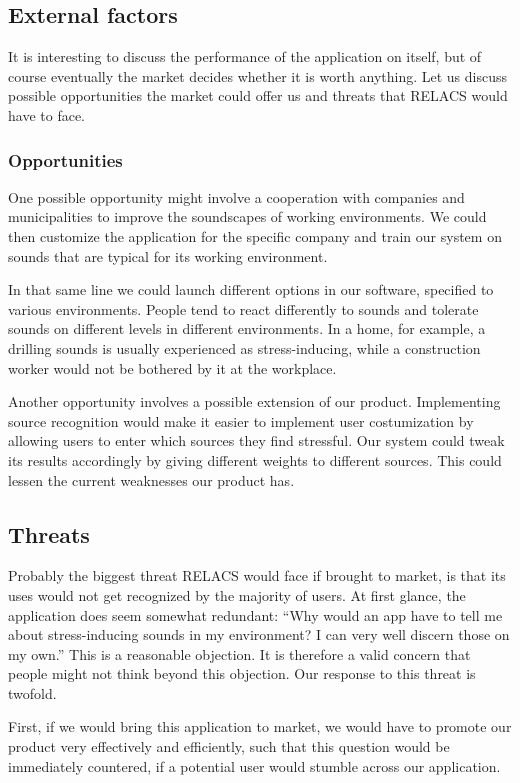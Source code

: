\documentclass[a4paper]{article}
\begin{document}
\subsection{External factors}
It is interesting to discuss the performance of the application on itself, but of course eventually the market decides whether it is worth anything.
Let us discuss possible opportunities the market could offer us and threats that RELACS would have to face.

\subsubsection{Opportunities}
One possible opportunity might involve a cooperation with companies and municipalities to improve the soundscapes of working environments.
We could then customize the application for the specific company and train our system on sounds that are typical for its working environment.

In that same line we could launch different options in our software, specified to various environments.
People tend to react differently to sounds and tolerate sounds on different levels in different environments.
In a home, for example, a drilling sounds is usually experienced as stress-inducing, while a construction worker would not be bothered by it at the workplace. 

Another opportunity involves a possible extension of our product. Implementing source recognition would make it easier to implement user costumization by allowing users to enter which sources they find stressful. Our system could tweak its results accordingly by giving different weights to different sources. This could lessen the current weaknesses our product has.


\subsection{Threats}
Probably the biggest threat RELACS would face if brought to market, is that its uses would not get recognized by the majority of users.
At first glance, the application does seem somewhat redundant: ``Why would an app have to tell me about stress-inducing sounds in my environment? I can very well discern those on my own.''
This is a reasonable objection.
It is therefore a valid concern that people might not think beyond this objection.
Our response to this threat is twofold.

First, if we would bring this application to market, we would have to promote our product very effectively and efficiently,
such that this question would be immediately countered, if a potential user would stumble across our application. 
\end{document}
